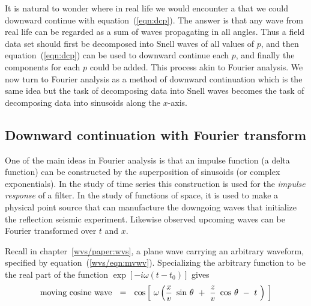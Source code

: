 \par
It is natural to wonder where in real life
we would encounter a  that we could downward continue
with equation~(\ref{eqn:dcp}).
The answer is that any wave from real life
can be regarded as a sum of waves propagating in all angles.
Thus a field data set should first be decomposed
into Snell waves of all values of $p$,
and then equation~(\ref{eqn:dcp})
can be used to downward continue each $p$,
and finally the components for each $p$ could be added.
This process akin to Fourier analysis.
We now turn to Fourier analysis as a method of downward continuation
which is the same idea but
the task of decomposing data into Snell waves
becomes the task of decomposing data into sinusoids along the $x$-axis.

\subsection{Downward continuation with Fourier transform}

\par
One of the main ideas in Fourier analysis
is that an impulse function
(a delta function)
can be constructed by the superposition of sinusoids
(or complex exponentials).
In the study of time series this construction is used for the
{\em 
impulse response
}
of a filter.
In the study of functions of space,
it is used to make a physical point source
that can manufacture the downgoing waves
that initialize the reflection seismic experiment.
Likewise observed upcoming waves can be Fourier transformed over $t$ and $x$.

\par
Recall in chapter~\ref{wvs/paper:wvs}, a plane wave carrying
an arbitrary waveform, specified by
equation~(\ref{wvs/eqn:mvwv}).
Specializing the arbitrary function to be
the real part of the function  $ \exp [ - i \omega (t-t_0 ) ]$  gives
\begin{equation}
\hbox{moving cosine wave} \ \ =\ \  \cos
\left[ \  \omega \left(  {x \over v }\  \sin \, \theta \ +\ 
{z \over v }\  \cos \, \theta \ -\  t \   \right) \   \right]
\label{eqn:2iei5}
\end{equation}

